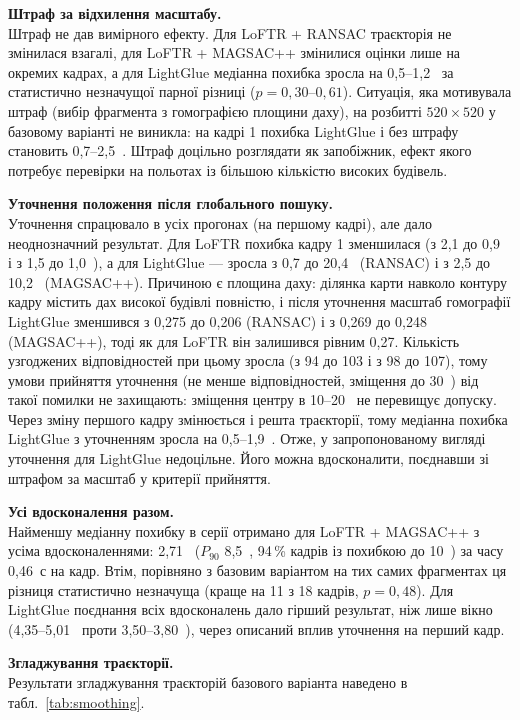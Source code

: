 \documentclass[a4paper, 12pt, titlepage]{article}
\begin{document}
\textbf{Штраф за відхилення масштабу.}\\
Штраф не дав вимірного ефекту. Для LoFTR + RANSAC траєкторія не змінилася взагалі, для LoFTR + MAGSAC++ змінилися оцінки лише на окремих кадрах, а для LightGlue медіанна похибка зросла на 0,5--1,2~\px{} за статистично незначущої парної різниці ($p = 0{,}30$--$0{,}61$). Ситуація, яка мотивувала штраф (вибір фрагмента з гомографією площини даху), на розбитті $520 \times 520$ у базовому варіанті не виникла: на кадрі 1 похибка LightGlue і без штрафу становить 0,7--2,5~\px{}. Штраф доцільно розглядати як запобіжник, ефект якого потребує перевірки на польотах із більшою кількістю високих будівель.

\textbf{Уточнення положення після глобального пошуку.}\\
Уточнення спрацювало в усіх прогонах (на першому кадрі), але дало неоднозначний результат. Для LoFTR похибка кадру 1 зменшилася (з 2,1 до 0,9~\px{} і з 1,5 до 1,0~\px{}), а для LightGlue --- зросла з 0,7 до 20,4~\px{} (RANSAC) і з 2,5 до 10,2~\px{} (MAGSAC++). Причиною є площина даху: ділянка карти навколо контуру кадру містить дах високої будівлі повністю, і після уточнення масштаб гомографії LightGlue зменшився з 0,275 до 0,206 (RANSAC) і з 0,269 до 0,248 (MAGSAC++), тоді як для LoFTR він залишився рівним 0,27. Кількість узгоджених відповідностей при цьому зросла (з 94 до 103 і з 98 до 107), тому умови прийняття уточнення (не менше відповідностей, зміщення до 30~\px{}) від такої помилки не захищають: зміщення центру в 10--20~\px{} не перевищує допуску. Через зміну першого кадру змінюється і решта траєкторії, тому медіанна похибка LightGlue з уточненням зросла на 0,5--1,9~\px{}. Отже, у запропонованому вигляді уточнення для LightGlue недоцільне. Його можна вдосконалити, поєднавши зі штрафом за масштаб у критерії прийняття.

\textbf{Усі вдосконалення разом.}\\
Найменшу медіанну похибку в серії отримано для LoFTR + MAGSAC++ з усіма вдосконаленнями: 2,71~\px{} ($P_{90}$ 8,5~\px{}, 94\,\% кадрів із похибкою до 10~\px{}) за часу 0,46~с на кадр. Втім, порівняно з базовим варіантом на тих самих фрагментах ця різниця статистично незначуща (краще на 11 з 18 кадрів, $p = 0{,}48$). Для LightGlue поєднання всіх вдосконалень дало гірший результат, ніж лише вікно (4,35--5,01~\px{} проти 3,50--3,80~\px{}), через описаний вплив уточнення на перший кадр.

\textbf{Згладжування траєкторії.}\\
Результати згладжування траєкторій базового варіанта наведено в табл.~\ref{tab:smoothing}.
\end{document}

